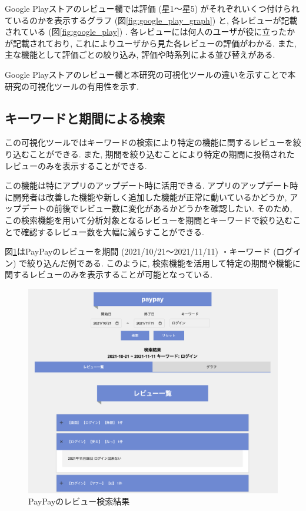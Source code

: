Google Playストアのレビュー欄では評価 (星1〜星5) がそれぞれいくつ付けられているのかを表示するグラフ (図\ref{fig:google_play_graph}) と, 各レビューが記載されている (図\ref{fig:google_play}) . 各レビューには何人のユーザが役に立ったかが記載されており, これによりユーザから見た各レビューの評価がわかる. 
また, 主な機能として評価ごとの絞り込み, 評価や時系列による並び替えがある. 

Google Playストアのレビュー欄と本研究の可視化ツールの違いを示すことで本研究の可視化ツールの有用性を示す. 

\subsection{キーワードと期間による検索}
この可視化ツールではキーワードの検索により特定の機能に関するレビューを絞り込むことができる. また, 期間を絞り込むことにより特定の期間に投稿されたレビューのみを表示することができる.  

この機能は特にアプリのアップデート時に活用できる. アプリのアップデート時に開発者は改善した機能や新しく追加した機能が正常に動いているかどうか, アップデートの前後でレビュー数に変化があるかどうかを確認したい. そのため, この検索機能を用いて分析対象となるレビューを期間とキーワードで絞り込むことで確認するレビュー数を大幅に減らすことができる. 

図\ref{fig:paypay_search}はPayPayのレビューを期間 (2021/10/21〜2021/11/11) ・キーワード (ログイン) で絞り込んだ例である. このように, 検索機能を活用して特定の期間や機能に関するレビューのみを表示することが可能となっている. 
\begin{figure}[H]
  \centering
  \includegraphics[scale=0.3]
    {contents/images/paypay_search.png}
  \caption{PayPayのレビュー検索結果\label{fig:paypay_search}}
\end{figure}


